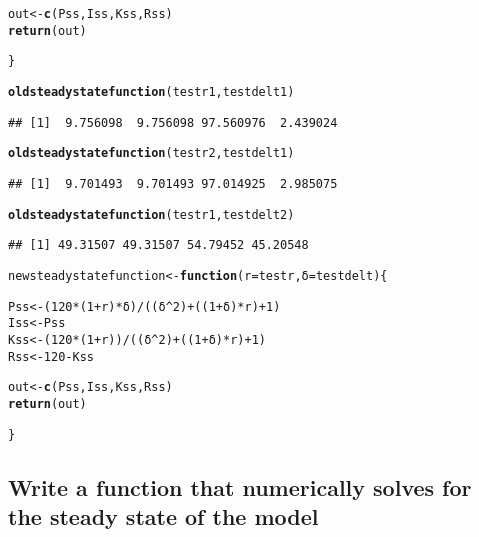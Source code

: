 \documentclass{article}\usepackage[]{graphicx}\usepackage[]{color}
\makeatletter
\newcommand{\hlnum}[1]{\textcolor[rgb]{0.686,0.059,0.569}{#1}}%
\newcommand{\hlopt}[1]{\textcolor[rgb]{0,0,0}{#1}}%
\newcommand{\hlstd}[1]{\textcolor[rgb]{0.345,0.345,0.345}{#1}}%
\newcommand{\hlkwa}[1]{\textcolor[rgb]{0.161,0.373,0.58}{\textbf{#1}}}%
\newcommand{\hlkwb}[1]{\textcolor[rgb]{0.69,0.353,0.396}{#1}}%
\newcommand{\hlkwc}[1]{\textcolor[rgb]{0.333,0.667,0.333}{#1}}%
\newcommand{\hlkwd}[1]{\textcolor[rgb]{0.737,0.353,0.396}{\textbf{#1}}}%
\newenvironment{kframe}{%
 \def\at@end@of@kframe{}%
 \ifinner\ifhmode%
  \def\at@end@of@kframe{\end{minipage}}%
  \begin{minipage}{\columnwidth}%
 \fi\fi%
 \def\FrameCommand##1{\hskip\@totalleftmargin \hskip-\fboxsep
 \colorbox{shadecolor}{##1}\hskip-\fboxsep
     \hskip-\linewidth \hskip-\@totalleftmargin \hskip\columnwidth}%
 \MakeFramed {\advance\hsize-\width
   \@totalleftmargin\z@ \linewidth\hsize
   \@setminipage}}%
 {\par\unskip\endMakeFramed%
 \at@end@of@kframe}
\newenvironment{knitrout}{}{} %
\makeatother
\begin{document}
\begin{knitrout}
\begin{kframe}
\begin{alltt}
\hlstd{out} \hlkwb{<-} \hlkwd{c}\hlstd{(Pss, Iss, Kss, Rss)}
\hlkwd{return}\hlstd{(out)}

\hlstd{\}}

\hlkwd{oldsteadystatefunction}\hlstd{(testr1, testdelt1)}
\end{alltt}
\begin{verbatim}
## [1]  9.756098  9.756098 97.560976  2.439024
\end{verbatim}
\begin{alltt}
\hlkwd{oldsteadystatefunction}\hlstd{(testr2, testdelt1)}
\end{alltt}
\begin{verbatim}
## [1]  9.701493  9.701493 97.014925  2.985075
\end{verbatim}
\begin{alltt}
\hlkwd{oldsteadystatefunction}\hlstd{(testr1, testdelt2)}
\end{alltt}
\begin{verbatim}
## [1] 49.31507 49.31507 54.79452 45.20548
\end{verbatim}
\begin{alltt}
\hlstd{newsteadystatefunction} \hlkwb{<-} \hlkwa{function}\hlstd{(}\hlkwc{r} \hlstd{= testr,}\hlkwc{δ} \hlstd{= testdelt)\{}

\hlstd{Pss} \hlkwb{<-} \hlstd{(}\hlnum{120}\hlopt{*}\hlstd{(}\hlnum{1}\hlopt{+}\hlstd{r)}\hlopt{*}\hlstd{δ)} \hlopt{/} \hlstd{((δ}\hlopt{^}\hlnum{2}\hlstd{)} \hlopt{+} \hlstd{((}\hlnum{1}\hlopt{+}\hlstd{δ)}\hlopt{*}\hlstd{r)} \hlopt{+} \hlnum{1}\hlstd{)}
\hlstd{Iss} \hlkwb{<-} \hlstd{Pss}
\hlstd{Kss} \hlkwb{<-} \hlstd{(}\hlnum{120}\hlopt{*}\hlstd{(}\hlnum{1}\hlopt{+}\hlstd{r))} \hlopt{/} \hlstd{((δ}\hlopt{^}\hlnum{2}\hlstd{)} \hlopt{+} \hlstd{((}\hlnum{1}\hlopt{+}\hlstd{δ)}\hlopt{*}\hlstd{r)} \hlopt{+} \hlnum{1}\hlstd{)}
\hlstd{Rss} \hlkwb{<-} \hlnum{120} \hlopt{-} \hlstd{Kss}

\hlstd{out} \hlkwb{<-} \hlkwd{c}\hlstd{(Pss, Iss, Kss, Rss)}
\hlkwd{return}\hlstd{(out)}

\hlstd{\}}
\end{alltt}
\end{kframe}
\end{knitrout}

\subsection{Write a function that numerically solves for the steady state of the model}
\end{document}

